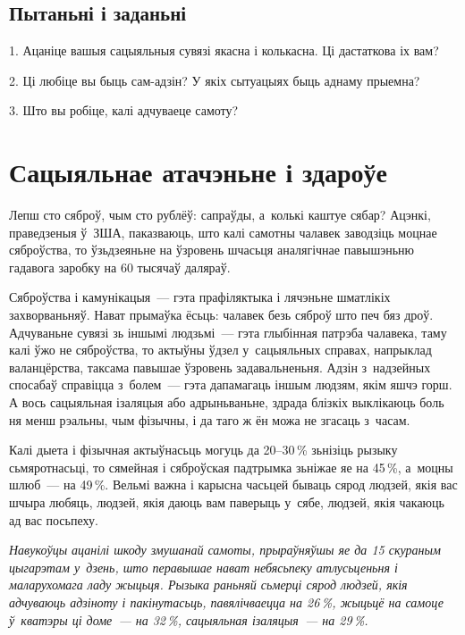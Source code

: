 \subsection*{Пытаньні і заданьні}

1. Ацаніце вашыя сацыяльныя сувязі якасна і колькасна. Ці дастаткова іх вам?

2. Ці любіце вы быць сам-адзін? У якіх сытуацыях быць аднаму прыемна?

3. Што вы робіце, калі адчуваеце самоту?


\section{Сацыяльнае атачэньне і здароўе}

Лепш сто сяброў, чым сто рублёў: сапраўды, а~колькі каштуе сябар? Ацэнкі, праведзеныя ў~ЗША, паказваюць, што калі самотны чалавек заводзіць моцнае сяброўства, то ўзьдзеяньне на ўзровень шчасьця аналягічнае павышэньню гадавога заробку на 60 тысячаў даляраў.

Сяброўства і камунікацыя~--- гэта прафіляктыка і лячэньне шматлікіх захворваньняў. Нават прымаўка ёсьць: чалавек безь сяброў што печ бяз дроў. Адчуваньне сувязі зь іншымі людзьмі~--- гэта глыбінная патрэба чалавека, таму калі ўжо не сяброўства, то актыўны ўдзел у~сацыяльных справах, напрыклад валанцёрства, таксама павышае ўзровень задавальненьня. Адзін з~надзейных спосабаў справіцца з~болем~--- гэта дапамагаць іншым людзям, якім яшчэ горш. А вось сацыяльная ізаляцыя або адрыньваньне, здрада блізкіх выклікаюць боль ня менш рэальны, чым фізычны, і да таго ж ён можа не згасаць з~часам.

Калі дыета і фізычная актыўнасьць могуць да 20--30\,\% зьнізіць рызыку сьмяротнасьці, то сямейная і сяброўская падтрымка зьніжае яе на 45\,\%, а~моцны шлюб~--- на 49\,\%. Вельмі важна і карысна часьцей бываць сярод людзей, якія вас шчыра любяць, людзей, якія даюць вам паверыць у~сябе, людзей, якія чакаюць ад вас посьпеху.

\emph{Навукоўцы ацанілі шкоду змушанай самоты, прыраўняўшы яе да 15 скураным цыгарэтам у~дзень, што перавышае нават небясьпеку атлусьценьня і маларухомага ладу жыцьця. Рызыка раньняй сьмерці сярод людзей, якія адчуваюць адзіноту і пакінутасьць, павялічваецца на 26\,\%, жыцьцё на самоце ў~кватэры ці доме~--- на 32\,\%, сацыяльная ізаляцыя~--- на 29\,\%.}


